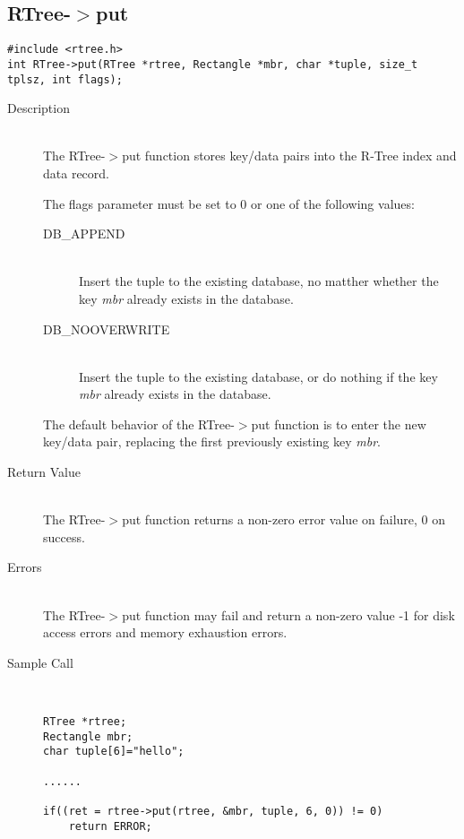 \documentclass[12pt]{article}
\def\cdf{\sf }
\def\cdf{\sf }
\newcommand{\RTREE}{{\small{\cdf RTree}}}
\newcommand{\DBNOOVERWRITE}{{\small{\cdf DB\_NOOVERWRITE}}}
\newcommand{\DBAPPEND}{{\small{\cdf DB\_APPEND}}}
\begin{document}
\subsection{{\RTREE}-$>$put}
\begin{verbatim}
#include <rtree.h>
int RTree->put(RTree *rtree, Rectangle *mbr, char *tuple, size_t tplsz, int flags);
\end{verbatim}
\begin{description}
\item[Description]\ \\
  The {\RTREE}-$>$put function stores key/data pairs into the
  R-Tree index and data record.

  The flags parameter must be set to 0 or one of the following values: 
  \begin{description}
  \item[{\DBAPPEND}]\ \\
    Insert the tuple to the existing database, no matther whether
    the key {\em mbr} already exists in the database.
  \item[{\DBNOOVERWRITE}]\ \\
    Insert the tuple to the existing database, or do nothing if
    the key {\em mbr} already exists in the database.
  \end{description}

  The default behavior of the {\RTREE}-$>$put function is to enter the
  new key/data pair, replacing the first previously existing key
  {\em mbr}.
\item[Return Value]\ \\
  The {\RTREE}-$>$put function returns a non-zero error value on
  failure, 0 on success.
\item[Errors]\ \\
  The {\RTREE}-$>$put function may fail and return a non-zero
  value -1 for disk access errors and memory exhaustion errors.
\item[Sample Call]\ 
\begin{verbatim}
RTree *rtree;
Rectangle mbr;
char tuple[6]="hello";

......

if((ret = rtree->put(rtree, &mbr, tuple, 6, 0)) != 0)
    return ERROR;
\end{verbatim}
\end{description}

\newpage
\end{document}
